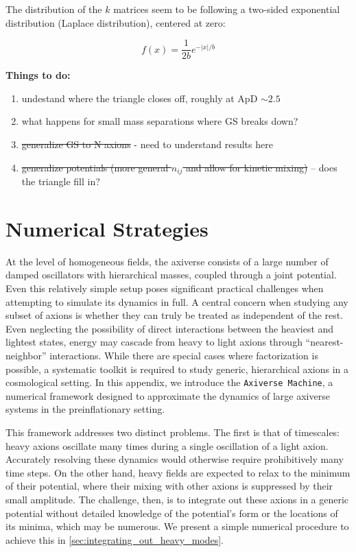 \documentclass{article}
\begin{document}
The distribution of the $k$ matrices seem to be following a two-sided exponential distribution (Laplace distribution), centered at zero:

\begin{equation}
    \label{eq:laplace-dist}
    f(x) = \frac{1}{2b}e^{-|x|/b}
\end{equation}

\color{red}\noindent \textbf{Things to do:}
\begin{enumerate}
    \item undestand where the triangle closes off, roughly at ApD $\sim 2.5$
    \item what happens for small mass separations where GS breaks down?
    \item \st{generalize GS to N axions} - need to understand results here
    \item \st{generalize potentials (more general $n_{ij}$ and allow for kinetic mixing) }– does the triangle fill in?
\end{enumerate}\color{black}

\appendix
\section{Numerical Strategies}

At the level of homogeneous fields, the axiverse consists of a large number of damped oscillators with hierarchical masses, coupled through a joint potential. Even this relatively simple setup poses significant practical challenges when attempting to simulate its dynamics in full. A central concern when studying any subset of axions is whether they can truly be treated as independent of the rest. Even neglecting the possibility of direct interactions between the heaviest and lightest states, energy may cascade from heavy to light axions through ``nearest-neighbor'' interactions. While there are special cases where factorization is possible, a systematic toolkit is required to study generic, hierarchical axions in a cosmological setting. In this appendix, we introduce the \texttt{Axiverse Machine}, a numerical framework designed to approximate the dynamics of large axiverse systems in the preinflationary setting. 

This framework addresses two distinct problems. The first is that of timescales: heavy axions oscillate many times during a single oscillation of a light axion. Accurately resolving these dynamics would otherwise require prohibitively many time steps. On the other hand, heavy fields are expected to relax to the minimum of their potential, where their mixing with other axions is suppressed by their small amplitude. The challenge, then, is to integrate out these axions in a generic potential without detailed knowledge of the potential’s form or the locations of its minima, which may be numerous. We present a simple numerical procedure to achieve this in \cref{sec:integrating_out_heavy_modes}.
\end{document}

